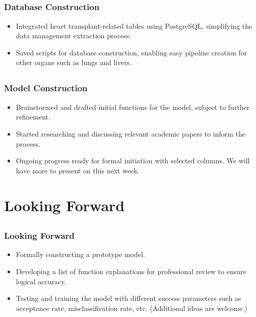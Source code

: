 \documentclass[pdf]{beamer}
\theoremstyle{definition} \theoremstyle{plain} \theoremstyle{remark}
\newcommand{\1}{\mathbf{1} }
\begin{document}
\subsection{}
\begin{frame}
\frametitle{Database Construction}
\begin{itemize}
    \item Integrated heart transplant-related tables using PostgreSQL, simplifying the data management extraction process.
    \vspace{0.12in}
    \item Saved scripts for database construction, enabling easy pipeline creation for other organs such as lungs and livers.
    \vspace{0.12in}
\end{itemize}
\end{frame}

\subsection{}
\begin{frame}
\frametitle{Model Construction}
\begin{itemize}
    \item Brainstormed and drafted initial functions for the model, subject to further refinement.
    \vspace{0.12in}
    \item Started researching and discussing relevant academic papers to inform the process.
    \vspace{0.12in}
    \item Ongoing progress ready for formal initiation with selected columns. We will have more to present on this next week.
    \vspace{0.12in}
\end{itemize}
\end{frame}

\section{Looking Forward}

\subsection{}
\begin{frame}
\frametitle{Looking Forward}
\begin{itemize}
    \item Formally constructing a prototype model.
    \vspace{0.12in}
    \item Developing a list of function explanations for professional review to ensure logical accuracy.
    \vspace{0.12in}
    \item Testing and training the model with different success parameters such as acceptance rate, misclassification rate, etc. (Additional ideas are welcome.)
    \vspace{0.12in}
\end{itemize}
\end{frame}
\end{document}
